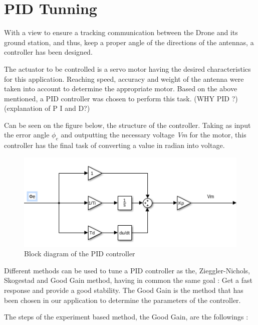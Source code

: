 \section{PID Tunning}\label{sec:pid_tunning}

With a view to ensure a tracking communication between the Drone and its ground station, and thus, keep a proper angle of the directions of the antennas, a controller has been designed.\par

The actuator to be controlled is a servo motor having the desired characteristics for this application.  Reaching speed, accuracy and weight of the antenna were taken into account to determine the appropriate motor. Based on the above mentioned, a PID controller was chosen to perform this task. (WHY PID ?) (explanation of P I and D?)\par

Can be seen on the figure below, the structure of the controller. Taking as input the error angle \textbf{$\phi_{e}$} and outputting the necessary voltage \textit{Vm} for the motor, this controller has the final task of converting a value in radian into voltage.\par

\begin{figure}[H]
  \centering
  \includegraphics[scale=0.5]{figures/PID_2D.png}
  \caption[LABEL] {Block diagram of the PID controller}
\end{figure}
  
Different methods can be used to tune a PID controller as the, Zieggler-Nichols, Skogestad and Good Gain method, having in common the same goal : Get a fast response and provide a good stability. The Good Gain is the method that has been chosen in our application to determine the parameters of the controller.\par
  
The steps of the experiment based method, the Good Gain, are the followings :\par 
  
